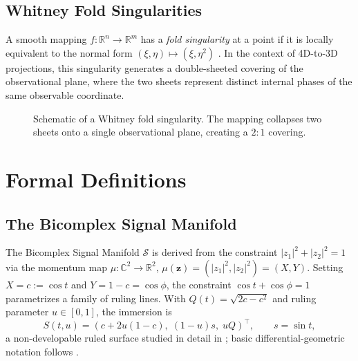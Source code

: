 \documentclass[11pt]{article}
\begin{document}
\subsection{Whitney Fold Singularities}
A smooth mapping $f: \mathbb{R}^n \to \mathbb{R}^m$ has a \emph{fold singularity}
at a point if it is locally equivalent to the normal form
$(\xi, \eta) \mapsto (\xi, \eta^2)$ \cite{GolubitskiGuillemin1973, Whitney1955, Arnold1991}.
In the context of 4D-to-3D projections, this singularity generates a
double-sheeted covering of the observational plane, where the two sheets
represent distinct internal phases of the same observable coordinate.

\begin{figure}[htbp]
\centering
{}
\caption{Schematic of a Whitney fold singularity.  The mapping collapses two
  sheets onto a single observational plane, creating a $2:1$ covering.}
\label{fig:whitney_fold}
\end{figure}

\section{Formal Definitions}
\label{sec:defs}

\subsection{The Bicomplex Signal Manifold}
The Bicomplex Signal Manifold $\mathcal{S}$ is derived from the constraint
$|z_1|^2 + |z_2|^2 = 1$ via the momentum map $\mu: \mathbb{C}^2 \to \mathbb{R}^2$,
$\mu(\mathbf{z}) = (|z_1|^2, |z_2|^2) = (X, Y)$.  Setting $X = c := \cos t$ and
$Y = 1-c = \cos\phi$, the constraint $\cos t + \cos\phi = 1$ parametrizes a
family of ruling lines.  With $Q(t) = \sqrt{2c - c^2}$ and ruling parameter
$u \in [0,1]$, the immersion is
\begin{equation}\label{eq:immersion}
  S(t,u)
  = (c + 2u(1-c),\; (1-u)s,\; uQ)^\top, \qquad s = \sin t,
\end{equation}
a non-developable ruled surface studied in detail in \cite{HayamiRuledSurface2026};
basic differential-geometric notation follows \cite{doCarmo1976}.
\end{document}
